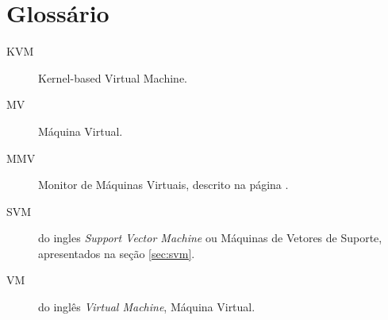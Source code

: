 %
%
\chapter{Glossário}

\begin{description}
\item[KVM] Kernel-based Virtual Machine.
\item[MV] Máquina Virtual.
\item[MMV] Monitor de Máquinas Virtuais, descrito na página \pageref{sec:virt}.
\item[SVM] do ingles \emph{Support Vector Machine} ou Máquinas de Vetores
de Suporte, apresentados na seção \ref{sec:svm}.
\item[VM] do inglês \emph{Virtual Machine}, Máquina Virtual.
\end{description}
